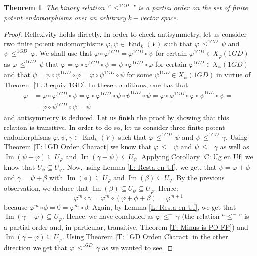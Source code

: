 \documentclass[10pt,a4paper]{amsart}
\newtheorem{thm}[defn]{Theorem}
\theoremstyle{plain}
\theoremstyle{remark}
\numberwithin{equation}{section} \numberwithin{defn}{section}
\newcommand\ed{\operatorname{End}}
\newcommand{\Img}{\operatorname{Im}}
\newcommand{\f}{\varphi}
\newcommand{\g}{\psi}
\begin{document}
\begin{thm}\label{T: 1GD Orden Parcial}
The binary relation ``$\, \leq^{1GD} \,$'' is a partial order on the set of finite potent endomorphisms over an arbitrary $k-$vector space.
\end{thm}
\begin{proof}
Reflexivity holds directly. In order to check antisymmetry, let us consider two finite potent endomorphisms $\f , \g \in \ed_k(V)$ such that $\f \, \leq^{1GD} \, \g$ and $\g \, \leq^{1GD} \, \f .$ We shall use that $\f \circ \f^{1GD}=\f^{1GD}\circ \g$ for certain $\f^{1GD}\in X_{\f}(1GD)$ as $\f \, \leq^{1GD} \, \g$ that $\f=\f\circ \f^{1GD}\circ \g =\g \circ \f^{1GD}\circ \f$ for certain $\f^{1GD}\in X_{\f}(1GD)$ and that $\g=\g\circ \g^{1GD}\circ \f =\f \circ \g^{1GD}\circ \g$ for some $\g^{1GD}\in X_{\g}(1GD)$ in virtue of Theorem \ref{T: 3 equiv 1GD}. In these conditions, one has that \begin{align*}
\f & = \f \circ \f^{1GD}\circ \g=\f\circ \f^{1GD}\circ \g \circ \g^{1GD}\circ \g=\f \circ \f^{1GD}\circ \f \circ \g^{1GD}\circ \g=\\& =\f \circ \g^{1GD}\circ \g= \g
\end{align*} and antisymmetry is deduced. Let us finish the proof by showing that this relation is transitive. In order to do so, let us consider three finite potent endomorphisms $\f , \g ,\gamma \in \ed_k(V)$ such that $\f \, \leq^{1GD}\, \g$ and $\g \, \leq^{1GD}\, \gamma .$ Using Theorem \ref{T: 1GD Orden Charact} we know that $\f \, \leq^{-} \, \g$ and $\g \, \leq^{-}\, \gamma $ as well as $\Img(\g-\f)\subseteq U_{\f}$ and $\Img(\gamma -\g)\subseteq U_{\g}.$ Applying Corollary \ref{C: Ug en Uf} we know that $U_{\g}\subseteq U_{\f}.$ Now, using Lemma \ref{L: Resta en Uf}, we get, that $\g= \f +\phi$ and $\gamma = \g + \beta$ with $\Img(\phi)\subseteq U_{\f}$ and $\Img(\beta)\subseteq U_{\g}.$ By the previous observation, we deduce that $\Img(\beta)\subseteq U_{\g}\subseteq U_{\f}.$ Hence: $$\f^m\circ \gamma =\f^m\circ (\f+ \phi + \beta)=\f^{m+1} $$ because $\f^m\circ \phi =0=\f^m\circ \beta .$ Again, by Lemma \ref{L: Resta en Uf}, we get that $\Img(\gamma - \f)\subseteq U_{\f}.$ Hence, we have concluded as $\f \, \leq^- \, \gamma$ (the relation ``$\leq^{-}$'' is a partial order and, in particular, transitive, Theorem \ref{T: Minus is PO FP}) and $\Img(\gamma - \f)\subseteq U_{\f}.$ Using Theorem \ref{T: 1GD Orden Charact} in the other direction we get that $\f \, \leq^{1GD}\, \gamma$ as we wanted to see.
\end{proof}
\end{document}
